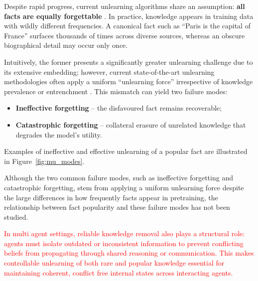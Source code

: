 \documentclass[sigconf,anonymous]{aamas}
\begin{document}
Despite rapid progress, current unlearning algorithms share an assumption: \textbf{all facts are equally forgettable} \cite{geng2025comprehensive, hu2024unlearning}.  
In practice, knowledge appears in training data with wildly different frequencies.  
A canonical fact such as \enquote{Paris is the capital of France} surfaces thousands of times across diverse sources, whereas an obscure biographical detail may occur only once.  

Intuitively, the former presents a significantly greater unlearning challenge due to its extensive embedding; however, current state-of-the-art unlearning methodologies often apply a uniform \enquote{unlearning force} irrespective of knowledge prevalence or entrenchment \cite{ren2025keeping, NEURIPS2024_16e18fa3}.
This mismatch can yield two failure modes:
\begin{itemize}
    \item \textbf{Ineffective forgetting} – the disfavoured fact remains recoverable;
    \item \textbf{Catastrophic forgetting} – collateral erasure of unrelated knowledge that degrades the model’s utility.
\end{itemize}

Examples of ineffective and effective unlearning of a popular fact are illustrated in Figure~\ref{fig:mu_modes}. 

Although the two common failure modes, such as ineffective forgetting and catastrophic forgetting, stem from applying a uniform unlearning force despite the large differences in how frequently facts appear in pretraining, the relationship between fact popularity and these failure modes has not been studied.



\textcolor{red}{
In multi agent settings, reliable knowledge removal also plays a structural role: agents must isolate outdated or inconsistent information to prevent conflicting beliefs from propagating through shared reasoning or communication. This makes controllable unlearning of both rare and popular knowledge essential for maintaining coherent, conflict free internal states across interacting agents.
}
\end{document}
